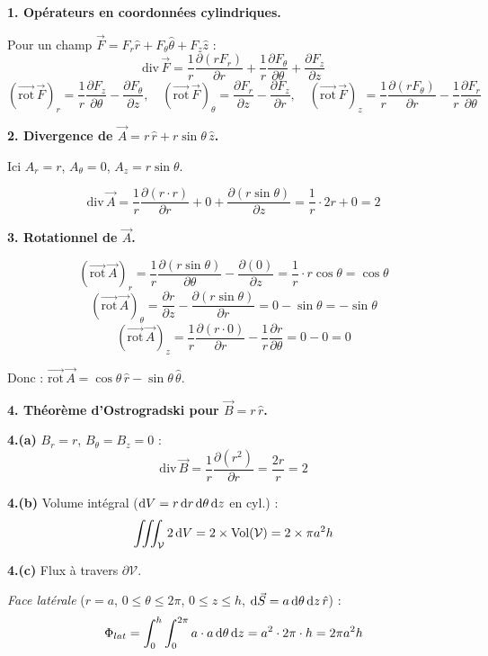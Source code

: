 \documentclass[12pt,a4paper]{article}
\begin{document}
\begin{boitecorrige}
\textbf{1. Opérateurs en coordonnées cylindriques.}

Pour un champ $\vec{F} = F_r\hat{r} + F_\theta\hat{\theta} + F_z\hat{z}$ :
\[
\text{div}\,\vec{F} = \frac{1}{r}\frac{\partial(rF_r)}{\partial r} + \frac{1}{r}\frac{\partial F_\theta}{\partial\theta} + \frac{\partial F_z}{\partial z}
\]
\[
(\overrightarrow{\text{rot}}\,\vec{F})_r = \frac{1}{r}\frac{\partial F_z}{\partial\theta} - \frac{\partial F_\theta}{\partial z}, \quad
(\overrightarrow{\text{rot}}\,\vec{F})_\theta = \frac{\partial F_r}{\partial z} - \frac{\partial F_z}{\partial r}, \quad
(\overrightarrow{\text{rot}}\,\vec{F})_z = \frac{1}{r}\frac{\partial(rF_\theta)}{\partial r} - \frac{1}{r}\frac{\partial F_r}{\partial\theta}
\]

\textbf{2. Divergence de $\vec{A} = r\,\hat{r} + r\sin\theta\,\hat{z}$.}

Ici $A_r = r$, $A_\theta = 0$, $A_z = r\sin\theta$.

\[
\text{div}\,\vec{A} = \frac{1}{r}\frac{\partial(r\cdot r)}{\partial r} + 0 + \frac{\partial(r\sin\theta)}{\partial z}
= \frac{1}{r}\cdot 2r + 0 = 2
\]

\textbf{3. Rotationnel de $\vec{A}$.}

\[
(\overrightarrow{\text{rot}}\,\vec{A})_r = \frac{1}{r}\frac{\partial(r\sin\theta)}{\partial\theta} - \frac{\partial(0)}{\partial z} = \frac{1}{r}\cdot r\cos\theta = \cos\theta
\]
\[
(\overrightarrow{\text{rot}}\,\vec{A})_\theta = \frac{\partial r}{\partial z} - \frac{\partial(r\sin\theta)}{\partial r} = 0 - \sin\theta = -\sin\theta
\]
\[
(\overrightarrow{\text{rot}}\,\vec{A})_z = \frac{1}{r}\frac{\partial(r\cdot 0)}{\partial r} - \frac{1}{r}\frac{\partial r}{\partial\theta} = 0 - 0 = 0
\]

Donc : $\overrightarrow{\text{rot}}\,\vec{A} = \cos\theta\,\hat{r} - \sin\theta\,\hat{\theta}$.

\textbf{4. Théorème d'Ostrogradski pour $\vec{B} = r\,\hat{r}$.}

\textbf{4.(a)} $B_r = r$, $B_\theta = B_z = 0$ :
\[
\text{div}\,\vec{B} = \frac{1}{r}\frac{\partial(r^2)}{\partial r} = \frac{2r}{r} = 2
\]

\textbf{4.(b)} Volume intégral ($\mathrm{d} V = r\,\mathrm{d} r\,\mathrm{d}\theta\,\mathrm{d} z$ en cyl.) :
\[
\iiint_\mathcal{V} 2\,\mathrm{d} V = 2\times\text{Vol}(\mathcal{V}) = 2\times\pi a^2 h
\]

\textbf{4.(c)} Flux à travers $\partial\mathcal{V}$.

\textit{Face latérale} ($r = a$, $0\leq\theta\leq2\pi$, $0\leq z\leq h$, $\mathrm{d}\vec{S} = a\,\mathrm{d}\theta\,\mathrm{d} z\,\hat{r}$) :
\[
\Phi_{lat} = \int_0^h\int_0^{2\pi} a\cdot a\,\mathrm{d}\theta\,\mathrm{d} z = a^2\cdot 2\pi\cdot h = 2\pi a^2 h
\]


\end{boitecorrige}
\end{document}
